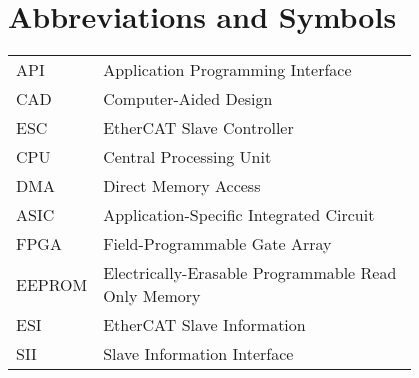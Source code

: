 \chapter*{Abbreviations and Symbols}

\begin{flushleft}
\begin{tabular}{l p{0.8\linewidth}}
API      & Application Programming Interface\\
CAD      & Computer-Aided Design\\
ESC      & EtherCAT Slave Controller\\
CPU      & Central Processing Unit\\
DMA      & Direct Memory Access\\
ASIC     & Application-Specific Integrated Circuit\\
FPGA     & Field-Programmable Gate Array\\
EEPROM   & Electrically-Erasable Programmable Read Only Memory\\
ESI      & EtherCAT Slave Information\\
SII      & Slave Information Interface\\
\end{tabular}
\end{flushleft}

